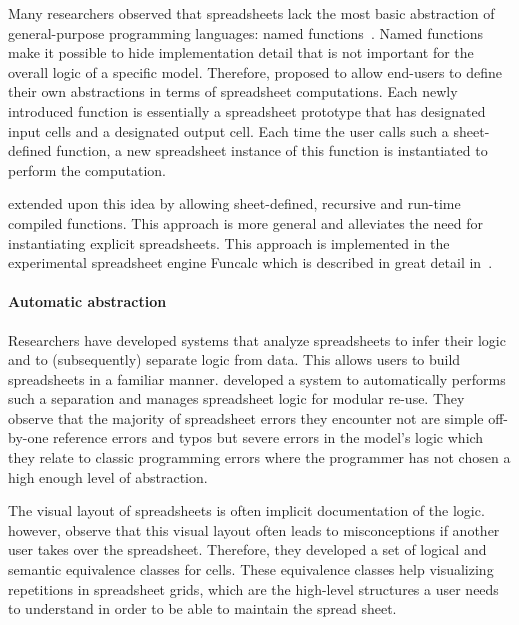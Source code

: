 \documentclass[a4paper]{article}
\begin{document}
Many researchers observed that spreadsheets lack the most basic
abstraction of general-purpose programming languages: named
functions~\cite{Jones:2003:UAF:944705.944721}. Named functions make it
possible to hide implementation detail that is not important for the
overall logic of a specific model. Therefore,
\citet{Jones:2003:UAF:944705.944721} proposed to allow end-users to
define their own abstractions in terms of spreadsheet
computations. Each newly introduced function is essentially a
spreadsheet prototype that has designated input cells and a designated
output cell. Each time the user calls such a sheet-defined function, a
new spreadsheet instance of this function is instantiated to perform
the computation.

\citet{Sestoft:2008:IFS:1370847.1370867} extended upon this idea by
allowing sheet-defined, recursive and run-time compiled
functions. This approach is more general and alleviates the need for
instantiating explicit spreadsheets. This approach is implemented in
the experimental spreadsheet engine Funcalc which is described in
great detail in~\cite{Sestoft2014Spreadsheet}.

\paragraph{Automatic abstraction}

Researchers have developed systems that analyze spreadsheets to infer
their logic and to (subsequently) separate logic from data. This
allows users to build spreadsheets in a familiar
manner. \citet{Isakowitz:1995:TLT:195705.195708} developed a system to
automatically performs such a separation and manages spreadsheet logic
for modular re-use. They observe that the majority of spreadsheet
errors they encounter not are simple off-by-one reference errors and
typos but severe errors in the model's logic which they relate to
classic programming errors where the programmer has not chosen a high
enough level of abstraction.

The visual layout of spreadsheets is often implicit documentation of
the logic. \citet{1173080} however, observe that this visual layout
often leads to misconceptions if another user takes over the
spreadsheet. Therefore, they developed a set of logical and semantic
equivalence classes for cells. These equivalence classes help
visualizing repetitions in spreadsheet grids, which are the high-level
structures a user needs to understand in order to be able to maintain
the spread sheet.
\end{document}
